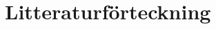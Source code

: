 \onecolumn
\chapter*{Litteraturförteckning}
\label{ch:litteratur}

\begin{flushleft}
  \renewcommand{\chapter}[2]{}%
  
  
\end{flushleft}

\twocolumn
